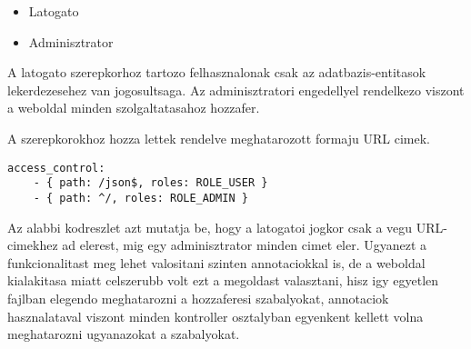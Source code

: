\begin{itemize}
	\item Latogato
	\item Adminisztrator
\end{itemize}

A latogato szerepkorhoz tartozo felhasznalonak csak az adatbazis-entitasok lekerdezesehez van jogosultsaga. 
Az adminisztratori engedellyel rendelkezo viszont a weboldal minden szolgaltatasahoz hozzafer. 

A szerepkorokhoz hozza lettek rendelve meghatarozott formaju URL cimek. 

\begin{lstlisting}
access_control:
    - { path: /json$, roles: ROLE_USER }
    - { path: ^/, roles: ROLE_ADMIN }
\end{lstlisting}
Az alabbi kodreszlet azt mutatja be, hogy a latogatoi jogkor csak a  vegu URL-cimekhez ad elerest, mig egy adminisztrator minden cimet eler. 
Ugyanezt a funkcionalitast meg lehet valositani szinten annotaciokkal is, de a weboldal kialakitasa miatt celszerubb volt ezt a megoldast valasztani, hisz igy egyetlen fajlban elegendo meghatarozni a hozzaferesi szabalyokat, annotaciok hasznalataval viszont minden kontroller osztalyban egyenkent kellett volna meghatarozni ugyanazokat a szabalyokat.
